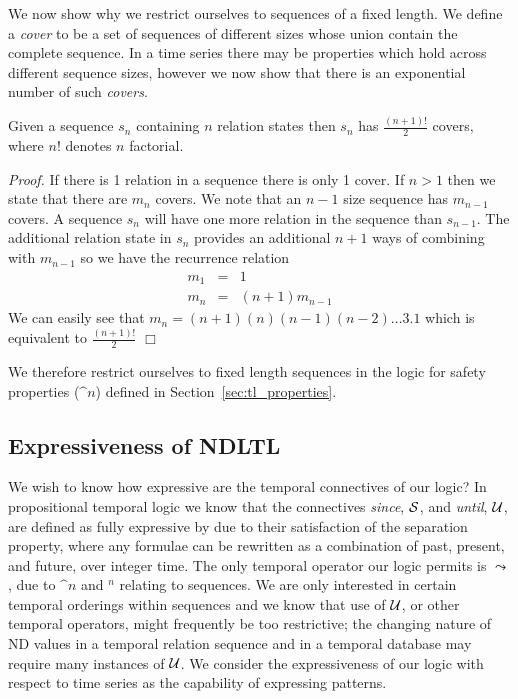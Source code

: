 We now show why we restrict ourselves to sequences of a fixed
length. We define a {\em cover} to be a set of sequences of different
sizes whose union contain the complete sequence. In a time series
there may be properties which hold across different sequence sizes,
however we now show that there is an exponential number of such {\em
covers}.  

\begin{lemma}\label{lemma:covernum}
\begin{rm}
Given a sequence $s_n$ containing $n$ relation states then $s_n$ has
$\frac{(n+1)!}{2}$ covers, where $n!$ denotes $n$ factorial.
\end{rm}
\end{lemma}

{\em Proof.} If there is 1 relation in a sequence there is only 1
cover.  If $n > 1$
then we state that there are $m_n$ covers.  We note that an $n-1$ size
sequence has $m_{n-1}$ covers. A sequence $s_n$ will have one more
relation in the sequence than $s_{n-1}$. The additional relation state in
$s_n$ provides an additional $n+1$ ways of combining with $m_{n-1}$ so
we have the recurrence relation
\begin{eqnarray*}
	m_1	& = & 1 \\
	m_n	& = & (n+1)m_{n-1}
\end{eqnarray*}
We can easily see that $m_n = (n+1)(n)(n-1)(n-2) \ldots 3.1$
which is equivalent to $\frac{(n+1)!}{2}$  $\Box$

\medskip

We therefore restrict ourselves to fixed length sequences in the logic
for safety properties ($\bm^n$) defined in Section~\ref{sec:tl_properties}.

\subsection{Expressiveness of NDLTL}

We wish to know how expressive are the temporal connectives of our
logic? In propositional temporal logic we know that the connectives
{\em since}, ${\cal S}$, and
{\em until}, ${\cal U}$, are defined as fully expressive by \cite{gps80}
due to their satisfaction of 
the separation property, where any formulae can be rewritten as a
combination of past, present, and future, over integer time. 
The only temporal operator
our logic permits is $\leadsto$, due to $\bm^n$ and \diam$^n$ relating
to sequences. We are only interested in certain
temporal orderings within sequences and we know that use of ${\cal
U}$, or other temporal operators, 
might frequently be too restrictive; the changing nature of ND values
in a temporal relation sequence and in a temporal database may require
many instances of ${\cal U}$.
We consider the expressiveness of
our logic with respect to time series as the capability of expressing
patterns. 

